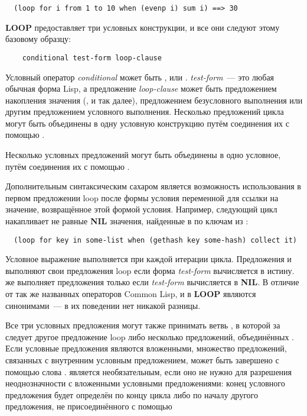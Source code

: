 \begin{lstlisting}
  (loop for i from 1 to 10 when (evenp i) sum i) ==> 30
\end{lstlisting}

\textbf{LOOP} предоставляет три условных конструкции, и все они следуют этому базовому образцу:

\begin{verbatim}
    conditional test-form loop-clause
\end{verbatim}

Условный оператор \textit{conditional} может быть ,  или
. \textit{test-form}~--- это любая обычная форма Lisp, а предложение
\textit{loop-clause} может быть предложением накопления значения (,
 и так далее), предложением безусловного выполнения или другим предложением
условного выполнения. Несколько предложений цикла могут быть объединены в одну условную
конструкцию путём соединения их с помощью .

Несколько условных предложений могут быть объединены в одно условное, путём соединения их
с помощью .

Дополнительным синтаксическим сахаром является возможность использования в первом
предложении loop после формы условия переменной  для ссылки на значение,
возвращённое этой формой условия. Например, следующий цикл накапливает не равные
\textbf{NIL} значения, найденные в  по ключам из :

\begin{lstlisting}
  (loop for key in some-list when (gethash key some-hash) collect it)
\end{lstlisting}

Условное выражение выполняется при каждой итерации цикла. Предложения  и
 выполняют свои предложения loop если форма \textit{test-form} вычисляется в
истину.  же выполняет предложения только если \textit{test-form} вычисляется
в \textbf{NIL}. В отличие от так же названных операторов Common Lisp,  и
 в \textbf{LOOP} являются синонимами~--- в их поведении нет никакой разницы.

Все три условных предложения могут также принимать ветвь , в которой за
 следует другое предложение loop либо несколько предложений, объединённых
. Если условные предложения являются вложенными, множество предложений,
связанных с внутренним условным предложением, может быть завершено с помощью слова
.  является необязательным, если оно не нужно для разрешения
неоднозначности с вложенными условными предложениями: конец условного предложения будет
определён по концу цикла либо по началу другого предложения, не присоединённого с помощью

